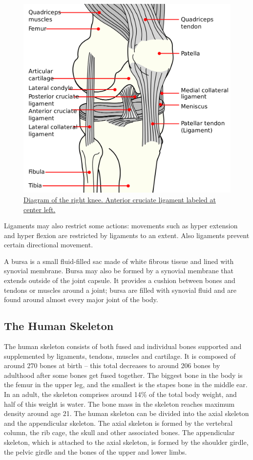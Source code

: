\begin{figure}

{\centering \includegraphics[width=0.7\linewidth]{./figures/locomotion/Knee_diagram} 

}

\caption{\href{https://commons.wikimedia.org/wiki/File:Knee_diagram.svg}{Diagram of the right knee. Anterior cruciate ligament labeled at center left.}}\label{fig:kneeligaments}
\end{figure}

Ligaments may also restrict some actions: movements such as hyper extension and hyper flexion are restricted by ligaments to an extent. Also ligaments prevent certain directional movement.

A bursa is a small fluid-filled sac made of white fibrous tissue and lined with synovial membrane. Bursa may also be formed by a synovial membrane that extends outside of the joint capsule. It provides a cushion between bones and tendons or muscles around a joint; bursa are filled with synovial fluid and are found around almost every major joint of the body.

\hypertarget{the-human-skeleton}{%
\subsection{The Human Skeleton}\label{the-human-skeleton}}

The human skeleton consists of both fused and individual bones supported and supplemented by ligaments, tendons, muscles and cartilage. It is composed of around 270 bones at birth -- this total decreases to around 206 bones by adulthood after some bones get fused together. The biggest bone in the body is the femur in the upper leg, and the smallest is the stapes bone in the middle ear. In an adult, the skeleton comprises around 14\% of the total body weight, and half of this weight is water. The bone mass in the skeleton reaches maximum density around age 21. The human skeleton can be divided into the axial skeleton and the appendicular skeleton. The axial skeleton is formed by the vertebral column, the rib cage, the skull and other associated bones. The appendicular skeleton, which is attached to the axial skeleton, is formed by the shoulder girdle, the pelvic girdle and the bones of the upper and lower limbs.



